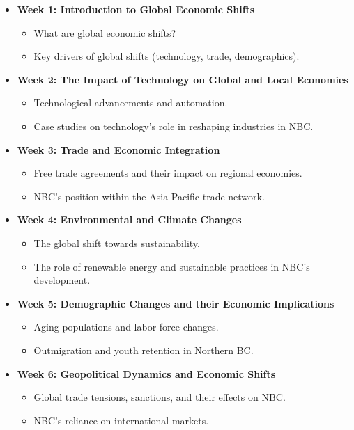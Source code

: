 \documentclass{article}
\begin{document}
\begin{itemize}
    \item \textbf{Week 1: Introduction to Global Economic Shifts}
    \begin{itemize}
        \item What are global economic shifts?
        \item Key drivers of global shifts (technology, trade, demographics).
    \end{itemize}
    
    \item \textbf{Week 2: The Impact of Technology on Global and Local Economies}
    \begin{itemize}
        \item Technological advancements and automation.
        \item Case studies on technology’s role in reshaping industries in NBC.
    \end{itemize}
    
    \item \textbf{Week 3: Trade and Economic Integration}
    \begin{itemize}
        \item Free trade agreements and their impact on regional economies.
        \item NBC's position within the Asia-Pacific trade network.
    \end{itemize}
    
    \item \textbf{Week 4: Environmental and Climate Changes}
    \begin{itemize}
        \item The global shift towards sustainability.
        \item The role of renewable energy and sustainable practices in NBC's development.
    \end{itemize}
    
    \item \textbf{Week 5: Demographic Changes and their Economic Implications}
    \begin{itemize}
        \item Aging populations and labor force changes.
        \item Outmigration and youth retention in Northern BC.
    \end{itemize}
    
    \item \textbf{Week 6: Geopolitical Dynamics and Economic Shifts}
    \begin{itemize}
        \item Global trade tensions, sanctions, and their effects on NBC.
        \item NBC's reliance on international markets.
    \end{itemize}
    

\end{itemize}
\end{document}
